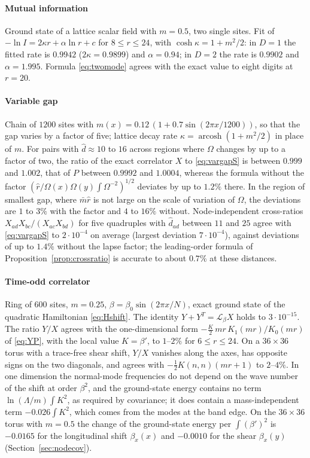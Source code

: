 \documentclass[11pt,a4paper]{article}
\theoremstyle{stmt}
\theoremstyle{defn}
\theoremstyle{rmk}
\numberwithin{equation}{section}
\begin{document}
\paragraph{Mutual information} Ground state of a lattice scalar field with $m=0.5$, two single sites. Fit of $-\ln I=2\kappa r+\alpha\ln r+c$ for $8\le r\le24$, with $\cosh\kappa=1+m^2/2$: in $D=1$ the fitted rate is $0.9942$ ($2\kappa=0.9899$) and $\alpha=0.94$; in $D=2$ the rate is $0.9902$ and $\alpha=1.995$. Formula \eqref{eq:twomode} agrees with the exact value to eight digits at $r=20$.

\paragraph{Variable gap} Chain of $1200$ sites with $m(x)=0.12\,(1+0.7\sin(2\pi x/1200))$, so that the gap varies by a factor of five; lattice decay rate $\kappa=\operatorname{arcosh}(1+m^2/2)$ in place of $m$. For pairs with $\hat d\approx10$ to $16$ across regions where $\Omega$ changes by up to a factor of two, the ratio of the exact correlator $X$ to \eqref{eq:vargapS} is between $0.999$ and $1.002$, that of $P$ between $0.9992$ and $1.0004$, whereas the formula without the factor $(\hat r/\Omega(x)\Omega(y)\int\Omega^{-2})^{1/2}$ deviates by up to $1.2\%$ there. In the region of smallest gap, where $\bar m\hat r$ is not large on the scale of variation of $\Omega$, the deviations are $1$ to $3\%$ with the factor and $4$ to $16\%$ without. Node-independent cross-ratios $X_{ad}X_{bc}/(X_{ac}X_{bd})$ for five quadruples with $\hat d_{ad}$ between $11$ and $25$ agree with \eqref{eq:vargapS} to $2\cdot10^{-4}$ on average (largest deviation $7\cdot10^{-4}$), against deviations of up to $1.4\%$ without the lapse factor; the leading-order formula of Proposition~\ref{prop:crossratio} is accurate to about $0.7\%$ at these distances.

\paragraph{Time-odd correlator} Ring of $600$ sites, $m=0.25$, $\beta=\beta_0\sin(2\pi x/N)$, exact ground state of the quadratic Hamiltonian \eqref{eq:Hshift}. The identity $Y+Y^{T}=\mathcal L_\beta X$ holds to $3\cdot10^{-15}$. The ratio $Y/X$ agrees with the one-dimensional form $-\tfrac K2\,mr\,K_1(mr)/K_0(mr)$ of \eqref{eq:YP}, with the local value $K=\beta'$, to $1$--$2\%$ for $6\le r\le24$. On a $36\times36$ torus with a trace-free shear shift, $Y/X$ vanishes along the axes, has opposite signs on the two diagonals, and agrees with $-\tfrac12K(n,n)(mr+1)$ to $2$--$4\%$. In one dimension the normal-mode frequencies do not depend on the wave number of the shift at order $\beta^2$, and the ground-state energy contains no term $\ln(\Lambda/m)\int K^2$, as required by covariance; it does contain a mass-independent term $-0.026\int K^2$, which comes from the modes at the band edge. On the $36\times36$ torus with $m=0.5$ the change of the ground-state energy per $\int(\beta')^2$ is $-0.0165$ for the longitudinal shift $\beta_x(x)$ and $-0.0010$ for the shear $\beta_x(y)$ (Section~\ref{sec:nodecov}).
\end{document}

